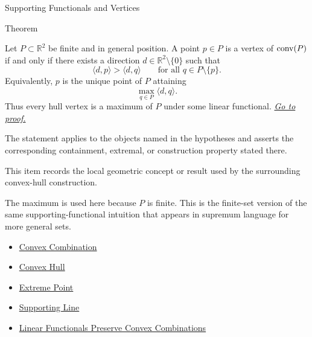 \begin{topicbox}{Supporting Functionals and Vertices}
\begin{theorembox}{Theorem}
\begin{theorem}
\label{thm:computational-geometry-supporting-functional-hull-vertices}
Let \(P\subset\mathbb{R}^2\) be finite and in general position. A point \(p\in P\)
is a vertex of \(\operatorname{conv}(P)\) if and only if there exists a direction
\(d\in\mathbb{R}^2\setminus\{0\}\) such that
\[
  \langle d,p\rangle>\langle d,q\rangle
  \qquad
  \text{for all } q\in P\setminus\{p\}.
\]
Equivalently, \(p\) is the unique point of \(P\) attaining
\[
  \max_{q\in P}\langle d,q\rangle.
\]
Thus every hull vertex is a maximum of \(P\) under some linear functional.
\hyperref[prf:computational-geometry-supporting-functional-hull-vertices]{\textit{Go to proof.}}
\end{theorem}
\end{theorembox}

\begin{remark*}
The statement applies to the objects named in the hypotheses and asserts the
corresponding containment, extremal, or construction property stated there.
\end{remark*}

\begin{remark*}[Interpretation]
This item records the local geometric concept or result used by the surrounding
convex-hull construction.
\end{remark*}

\begin{remark*}[Exposition]
The maximum is used here because \(P\) is finite. This is the finite-set version
of the same supporting-functional intuition that appears in supremum language
for more general sets.
\end{remark*}

\begin{dependencies}
\begin{itemize}
  \item \hyperref[def:computational-geometry-convex-combination]{Convex Combination}
  \item \hyperref[def:computational-geometry-convex-hull]{Convex Hull}
  \item \hyperref[def:computational-geometry-extreme-point]{Extreme Point}
  \item \hyperref[def:computational-geometry-supporting-line]{Supporting Line}
  \item \hyperref[lem:computational-geometry-linear-functionals-convex-combinations]{Linear Functionals Preserve Convex Combinations}
\end{itemize}
\end{dependencies}
\end{topicbox}

